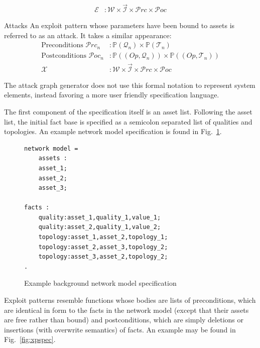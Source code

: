 \begin{description}
\begin{align*}
			\mathcal{E}&: \mathcal{W} \times \vec{\mathcal{I}} \times  \mathcal{P}rc \times \mathcal{P}oc
        \end{align*}
    \begin{samepage}
    \item[Attacks] An exploit pattern whose parameters have been bound to assets is referred to as an
		attack. It takes a similar appearance:
		\begin{align*}
			\text{Preconditions } \mathcal{P}rc_n &: \mathbb{P}(\mathcal{Q}_n) \times \mathbb{P}(\mathcal{T}_n) \\
			\text{Postconditions } \mathcal{P}oc_n&: \mathbb{P}((Op,\mathcal{Q}_n)) \times \mathbb{P}((Op,\mathcal{T}_n)) \\
			\mathcal{X}&: \mathcal{W} \times \vec{\mathcal{I}} \times  \mathcal{P}rc \times \mathcal{P}oc
        \end{align*}
    \end{samepage}
\end{description}

The attack graph generator does 
not use this formal notation to represent system elements, instead favoring a 
more user friendly specification language. 

The first component of the specification itself is an asset list. Following the
asset list, the initial
fact base is specified as a semicolon separated list of qualities and 
topologies. An example network model specification is found in 
Fig.~\ref{fig:nmspec}.

\begin{figure}
\begin{lstlisting}
network model = 
    assets :
    asset_1;
    asset_2;
    asset_3;

facts :
	quality:asset_1,quality_1,value_1;
	quality:asset_2,quality_1,value_2;
	topology:asset_1,asset_2,topology_1;
	topology:asset_2,asset_3,topology_2;
    topology:asset_3,asset_2,topology_2;
.
\end{lstlisting}
\caption{Example background network model specification}
\label{fig:nmspec}
\end{figure}
Exploit patterns resemble functions whose bodies are lists of preconditions,
which are identical in form to the facts in the network model (except that their
assets are free rather than bound) and postconditions, which are simply
deletions or insertions (with overwrite semantics) of facts. An example may be 
found in Fig.~\ref{fig:xpspec}.

